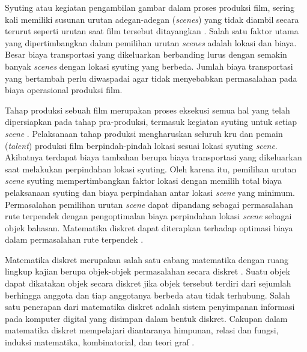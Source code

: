 {\frenchspacing
    Syuting atau kegiatan pengambilan gambar dalam proses produksi film, sering kali memiliki susunan urutan adegan-adegan (\textit{scenes}) yang tidak diambil secara terurut seperti
    urutan saat film tersebut ditayangkan .
    Salah satu faktor utama yang dipertimbangkan dalam pemilihan urutan \textit{scenes} adalah lokasi dan biaya.
    Besar biaya transportasi yang dikeluarkan berbanding lurus dengan semakin banyak \textit{scenes} dengan lokasi syuting yang berbeda.
    Jumlah biaya transportasi yang bertambah perlu diwaspadai agar tidak menyebabkan permasalahan pada biaya operasional produksi film.

    Tahap produksi sebuah film merupakan proses eksekusi semua hal yang telah dipersiapkan pada tahap pra-produksi, termasuk kegiatan syuting untuk setiap \textit{scene} .
    Pelaksanaan tahap produksi mengharuskan seluruh kru dan pemain (\textit{talent}) produksi film berpindah-pindah lokasi sesuai lokasi syuting \textit{scene}.
    Akibatnya terdapat biaya tambahan berupa biaya transportasi yang dikeluarkan saat melakukan perpindahan lokasi syuting.
    Oleh karena itu, pemilihan urutan \textit{scene} syuting mempertimbangkan faktor lokasi dengan memilih total biaya pelaksanaan syuting dan biaya perpindahan antar lokasi \textit{scene} yang minimum.
    Permasalahan pemilihan urutan \textit{scene} dapat dipandang sebagai permasalahan rute terpendek dengan pengoptimalan biaya perpindahan lokasi \textit{scene} sebagai objek bahasan.
    Matematika diskret dapat diterapkan terhadap optimasi biaya dalam permasalahan rute terpendek .

    Matematika diskret merupakan salah satu cabang matematika dengan ruang lingkup kajian berupa objek-objek permasalahan secara diskret .
    Suatu objek dapat dikatakan objek secara diskret jika objek tersebut terdiri dari sejumlah berhingga anggota dan tiap anggotanya berbeda atau tidak terhubung.
    Salah satu penerapan dari matematika diskret adalah sistem penyimpanan informasi pada komputer digital yang disimpan dalam bentuk diskret.
    Cakupan dalam matematika diskret mempelajari diantaranya himpunan, relasi dan fungsi, induksi matematika, kombinatorial, dan teori graf .

}
